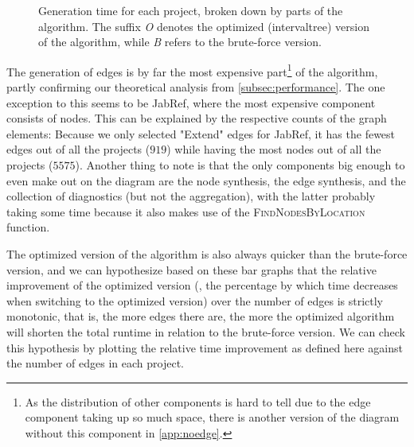 \documentclass[../thesis]{subfiles}
\begin{document}
\begin{figure}
\begin{subfigure}[T]{0.5\textwidth}
\begin{center}
		\end{center}
	\end{subfigure}
	\caption{Generation time for each project, broken down by parts of the algorithm.
		The suffix \emph{O} denotes the optimized (\gls{intervaltree}) version of the algorithm, while \emph{B} refers to the brute-force version.
	}\label{fig:techeval}
\end{figure}

The generation of edges is by far the most expensive part\footnote{
	As the distribution of other components is hard to tell due to the edge component taking up so much space, there is another version of the diagram without this component in \cref{app:noedge}.
} of the algorithm, partly confirming our theoretical analysis from \cref{subsec:performance}.
The one exception to this seems to be JabRef, where the most expensive component consists of nodes.
This can be explained by the respective counts of the graph elements:
Because we only selected "Extend" edges for JabRef, it has the fewest edges out of all the projects ($919$) while having the most nodes out of all the projects ($5575$).
Another thing to note is that the only components big enough to even make out on the diagram are the node synthesis, the edge synthesis, and the collection of diagnostics (but not the aggregation), with the latter probably taking some time because it also makes use of the \textsc{FindNodesByLocation} function.

The optimized version of the algorithm is also always quicker than the brute-force version, and we can hypothesize based on these bar graphs that the relative improvement of the optimized version (\ie, the percentage by which time decreases when switching to the optimized version) over the number of edges is strictly monotonic, that is, the more edges there are, the more the optimized algorithm will shorten the total runtime in relation to the brute-force version.
We can check this hypothesis by plotting the relative time improvement as defined here against the number of edges in each project.
\end{document}

